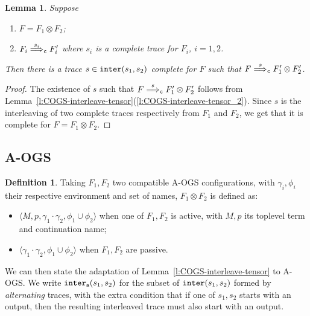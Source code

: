 \documentclass[11pt,a4paper]{amsart}
\theoremstyle{plain}
\theoremstyle{definition}
\theoremstyle{defC}
\theoremstyle{thmC}
\theoremstyle{plain}
\numberwithin{equation}{section}
\newcommand{\wrt}{with respect to\xspace}  %
\newcommand{\tr}{s}
\newcommand{\stti}{\sigma_i}
\newcommand{\AOGS}{\mbox{{\rm A-OGS}}\xspace}      %
\newcommand{\appendCon}[2]{#1 \otimes #2}
\newcommand{\rmm}[1]{{\tt{\lowercase{#1}}}}
\newcommand{\genArr}[2]{\mathrel{\stackrel{{#1}}{\Longrightarrow}_{\rmm{\lowercase{#2}}}}}  %
\newcommand{\ArrC}[1]{\genArr{#1}{C}}   %
\newcommand{\interl}[2]{{\tt inter}( #1, #2)}
\newcommand{\interlA}[2]{{\tt inter_{a}}( #1, #2)}
\newcommand{\FF}{F}
\newcommand{\conf}[1]{\langle #1\rangle}
\theoremstyle{plain}
\newtheorem{lemma}[thm]{Lemma}
\theoremstyle{definition}
\newtheorem{definition}[thm]{Definition}
\begin{document}
\begin{lemma}
  \label{l:COGS-recomp-ct}
  Suppose 
  \begin{enumerate}
  \item $\FF = \FF_1 \otimes \FF_2$;   
  \item $\FF_i \ArrC{\tr_i} \FF_i'$ where 
  $\tr_i$ is a complete trace for $\FF_i$, %
   $i=1,2$. 
  \end{enumerate} 
  Then there is a trace 
   $\tr \in \interl{\tr_1}{\tr_2}$ complete for $\FF$ such that
  $\FF \ArrC{\tr}{\FF'_1} \otimes {\FF'_2}$. 
\end{lemma}

\begin{proof}
  The existence of $\tr$ such that $\FF \ArrC{\tr}{\FF'_1} \otimes {\FF'_2}$ follows from 
  Lemma~\ref{l:COGS-interleave-tensor}(\ref{l:COGS-interleave-tensor_2}). 
  Since $\tr$ is the interleaving of two complete traces respectively from 
  $\FF_1$ and $\FF_2$, we get that it is complete for $\FF = \FF_1 \otimes \FF_2$.
\end{proof} 

\subsection{\AOGS}
\label{a:tensor-aogs}

\begin{definition}
Taking $\FF_1,\FF_2$ two compatible \AOGS configurations, with 
 $\gamma_i,\phi_i$ their respective environment and set of names,
$\appendCon{\FF_1} {\FF_2}$ is defined as:
\begin{itemize}
 \item $\conf{M,p,\gamma_1 \cdot \gamma_2,\phi_1 \cup \phi_2}$
 when one of $\FF_1,\FF_2$  is active, with $M,p$ its toplevel term and continuation name;
 \item $\conf{\gamma_1 \cdot \gamma_2,\phi_1 \cup \phi_2}$
 when $\FF_1,\FF_2$  are passive.
\end{itemize}
\end{definition}
\noindent
We can then state the adaptation of Lemma~\ref{l:COGS-interleave-tensor} to \AOGS.
We write $\interlA{\tr_1}{\tr_2}$ for the subset of $\interl{\tr_1}{\tr_2}$
formed by \emph{alternating} traces, with the
extra condition that if one of $\tr_1,\tr_2$
starts with an output, then the resulting interleaved trace must also start with an output.
\end{document}
